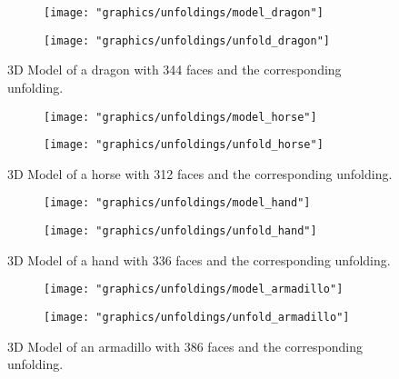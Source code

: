 \documentclass[draft,final]{vutinfth} %
\begin{document}
\begin{figure}
  \begin{subfigure}[b]{0.5\textwidth}
    \texttt{[image: "graphics/unfoldings/model\_dragon"]}
  \end{subfigure}
  \begin{subfigure}[b]{0.5\textwidth}
    \texttt{[image: "graphics/unfoldings/unfold\_dragon"]}
  \end{subfigure}
  
  \caption{3D Model of a dragon with 344 faces and the corresponding unfolding.}
  \label{fig:dragon}
\end{figure}

\begin{figure}
  \begin{subfigure}[b]{0.5\textwidth}
    \texttt{[image: "graphics/unfoldings/model\_horse"]}
  \end{subfigure}
  \begin{subfigure}[b]{0.5\textwidth}
    \texttt{[image: "graphics/unfoldings/unfold\_horse"]}
  \end{subfigure}
  
  \caption{3D Model of a horse with 312 faces and the corresponding unfolding.}
  \label{fig:horse}
\end{figure}

\begin{figure}
  \begin{subfigure}[b]{0.5\textwidth}
    \texttt{[image: "graphics/unfoldings/model\_hand"]}
  \end{subfigure}
  \begin{subfigure}[b]{0.5\textwidth}
    \texttt{[image: "graphics/unfoldings/unfold\_hand"]}
  \end{subfigure}
  
  \caption{3D Model of a hand with 336 faces and the corresponding unfolding.}
  \label{fig:hand}
\end{figure}

\begin{figure}
  \begin{subfigure}[b]{0.5\textwidth}
    \texttt{[image: "graphics/unfoldings/model\_armadillo"]}
  \end{subfigure}
  \begin{subfigure}[b]{0.5\textwidth}
    \texttt{[image: "graphics/unfoldings/unfold\_armadillo"]}
  \end{subfigure}
  
  \caption{3D Model of an armadillo with 386 faces and the corresponding unfolding.}
  \label{fig:armadillo}
\end{figure}
\end{document}
